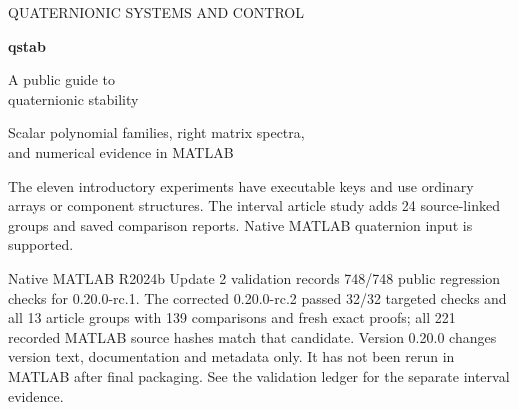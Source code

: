 \documentclass[11pt,a4paper]{article}
\newcommand{\lead}[1]{\par\smallskip\noindent{\sffamily\bfseries\color{teal}#1}\enspace}
\begin{document}
\thispagestyle{empty}
{\color{teal}\sffamily QUATERNIONIC SYSTEMS AND CONTROL}\par\vspace{17mm}
{\sffamily\bfseries\color{ink}\fontsize{48}{50}\selectfont qstab}\par\vspace{5mm}
{\sffamily\fontsize{25}{30}\selectfont A public guide to\\quaternionic stability}\par\vspace{9mm}
{\Large Scalar polynomial families, right matrix spectra,\\ and numerical evidence in MATLAB}\par\vspace{6mm}
\vfill
\lead{Read with MATLAB open} The eleven introductory experiments have executable keys and use ordinary arrays or component structures. The interval article study adds 24 source-linked groups and saved comparison reports. Native MATLAB quaternion input is supported.\par
\vspace{6mm}{\sffamily Version 0.20.0 \enspace / \enspace 27 November 2026}\par
{\small\color{muted}Native MATLAB R2024b Update 2 validation records 748/748 public regression checks for 0.20.0-rc.1. The corrected 0.20.0-rc.2 passed 32/32 targeted checks and all 13 article groups with 139 comparisons and fresh exact proofs; all 221 recorded MATLAB source hashes match that candidate. Version 0.20.0 changes version text, documentation and metadata only. It has not been rerun in MATLAB after final packaging. See the validation ledger for the separate interval evidence.}\par
\end{document}
